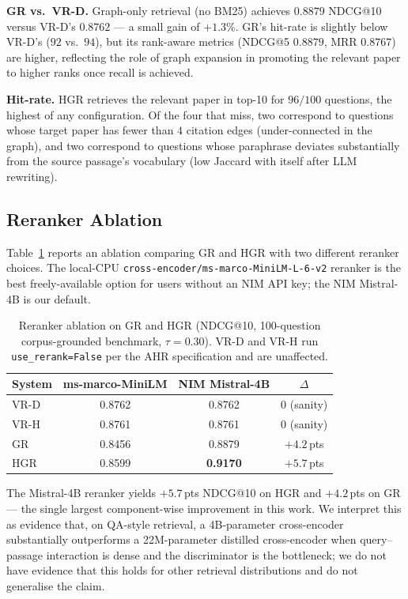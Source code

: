 \documentclass[journal]{IEEEtran}
\begin{document}
\textbf{GR vs.\ VR-D.} Graph-only retrieval (no BM25) achieves
$0.8879$ NDCG@10 versus VR-D's $0.8762$ — a small gain of $+1.3\%$.
GR's hit-rate is slightly below VR-D's ($92$ vs.\ $94$), but its
rank-aware metrics (NDCG@5 $0.8879$, MRR $0.8767$) are higher,
reflecting the role of graph expansion in promoting the relevant
paper to higher ranks once recall is achieved.

\textbf{Hit-rate.} HGR retrieves the relevant paper in top-10 for
$96/100$ questions, the highest of any configuration. Of the four
that miss, two correspond to questions whose target paper has fewer
than $4$ citation edges (under-connected in the graph), and two
correspond to questions whose paraphrase deviates substantially from
the source passage's vocabulary (low Jaccard with itself after
LLM rewriting).

\subsection{Reranker Ablation}
\label{sec:reranker-ablation}

Table~\ref{tab:reranker} reports an ablation comparing GR and HGR
with two different reranker choices. The local-CPU
\texttt{cross-encoder/ms-marco-MiniLM-L-6-v2} reranker is the best
freely-available option for users without an NIM API key; the NIM
Mistral-4B is our default.

\begin{table}[!t]
\centering
\caption{Reranker ablation on GR and HGR (NDCG@10, 100-question
corpus-grounded benchmark, $\tau=0.30$). VR-D and VR-H run
\texttt{use\_rerank=False} per the AHR specification and are
unaffected.}
\label{tab:reranker}
\setlength{\tabcolsep}{4pt}
\begin{tabular}{@{}lccc@{}}
\toprule
\textbf{System} & \textbf{ms-marco-MiniLM} & \textbf{NIM Mistral-4B} & \textbf{$\Delta$} \\
\midrule
VR-D & 0.8762 & 0.8762 & 0 (sanity) \\
VR-H & 0.8761 & 0.8761 & 0 (sanity) \\
GR   & 0.8456 & 0.8879 & $+4.2$\,pts \\
HGR  & 0.8599 & \textbf{0.9170} & $+5.7$\,pts \\
\bottomrule
\end{tabular}
\end{table}

The Mistral-4B reranker yields $+5.7$\,pts NDCG@10 on HGR and
$+4.2$\,pts on GR — the single largest component-wise improvement in
this work. We interpret this as evidence that, on QA-style retrieval,
a 4B-parameter cross-encoder substantially outperforms a 22M-parameter
distilled cross-encoder when query–passage interaction is dense and
the discriminator is the bottleneck; we do not have evidence that
this holds for other retrieval distributions and do not generalise
the claim.
\end{document}
